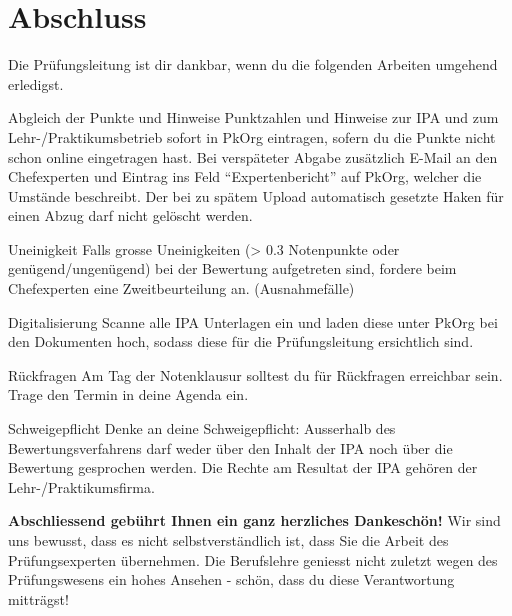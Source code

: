 \chapter{Abschluss}
Die Prüfungsleitung ist dir dankbar, wenn du die folgenden Arbeiten umgehend erledigst.

\begin{taskitemwithoutcomment}{Abgleich der Punkte und Hinweise}
  Punktzahlen und Hinweise zur IPA und zum Lehr-/Praktikumsbetrieb sofort in PkOrg eintragen, sofern du die Punkte nicht schon online eingetragen hast. Bei verspäteter Abgabe zusätzlich E-Mail an den Chefexperten und Eintrag ins Feld \enquote{Expertenbericht} auf PkOrg, welcher die Umstände beschreibt. Der bei zu spätem Upload automatisch gesetzte Haken für einen Abzug darf nicht gelöscht werden.
\end{taskitemwithoutcomment}
\begin{taskitemwithoutcomment}{Uneinigkeit}
  Falls grosse Uneinigkeiten (> 0.3 Notenpunkte oder genügend/ungenügend) bei der Bewertung aufgetreten sind, fordere beim Chefexperten eine Zweitbeurteilung an. (Ausnahmefälle)
\end{taskitemwithoutcomment}
\begin{taskitemwithoutcomment}{Digitalisierung}
  Scanne alle IPA Unterlagen ein und laden diese unter PkOrg bei den Dokumenten hoch, sodass diese für die Prüfungsleitung ersichtlich sind.
\end{taskitemwithoutcomment}
\begin{taskitemwithoutcomment}{Rückfragen}
  Am Tag der Notenklausur solltest du für Rückfragen erreichbar sein. Trage den Termin in deine Agenda ein.
\end{taskitemwithoutcomment}
\begin{taskitemwithoutcomment}{Schweigepflicht}
  Denke an deine Schweigepflicht: Ausserhalb des Bewertungsverfahrens darf weder über den Inhalt der IPA noch über die Bewertung gesprochen werden. Die Rechte am Resultat der IPA gehören der Lehr-/Praktikumsfirma.
\end{taskitemwithoutcomment}

\textbf{Abschliessend gebührt Ihnen ein ganz herzliches Dankeschön!}
Wir sind uns bewusst, dass es nicht selbstverständlich ist, dass Sie die Arbeit des Prüfungsexperten übernehmen. Die Berufslehre geniesst nicht zuletzt wegen des Prüfungswesens ein hohes Ansehen - schön, dass du diese Verantwortung mitträgst!